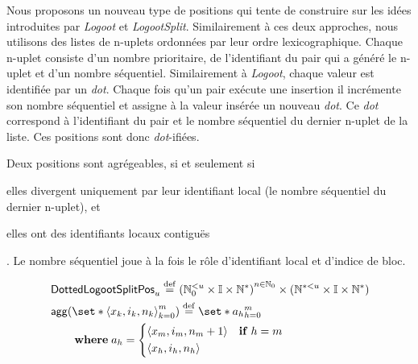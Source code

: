 Nous proposons un nouveau type de positions qui tente de construire sur les idées introduites par \emph{Logoot} et \emph{LogootSplit}.
Similairement à ces deux approches, nous utilisons des listes de n-uplets ordonnées par leur ordre lexicographique.
Chaque n-uplet consiste d'un nombre prioritaire, de l'identifiant du pair qui a généré le n-uplet et d'un nombre séquentiel. 
Similairement à \emph{Logoot}, chaque valeur est identifiée par un \emph{dot}.
Chaque fois qu'un pair exécute une insertion il incrémente son nombre séquentiel et assigne à la valeur insérée un nouveau \emph{dot}.
Ce \emph{dot} correspond à l'identifiant du pair et le nombre séquentiel du dernier n-uplet de la liste.
Ces positions sont donc \emph{dot}-ifiées.

Deux positions sont agrégeables, si et seulement si \begin{inlinelist}\item elles divergent uniquement par leur identifiant local (le nombre séquentiel du dernier n-uplet), et \item elles ont des identifiants locaux contiguës\end{inlinelist}.
Le nombre séquentiel joue à la fois le rôle d'identifiant local et d'indice de bloc.

\begin{align}
&\trm{DottedLogootSplitPos}_u \defeq {(\mathbb{N}_0^{< u} \times \mathbb{I} \times \mathbb{N}^*)}^{n \in \mathbb{N}_0} \times (\mathbb{N}^{* < u} \times \mathbb{I} \times \mathbb{N}^*)\\
&\begin{aligned}
    \MoveEqLeft \trm{agg}(\set*{\tuple*{x_k, i_k, n_k}}_{k=0}^m) \defeq \set*{a_h}_{h=0}^m\\
    &\where a_h = \begin{dcases}
        \tuple*{x_m, i_m, n_m + 1} & \when h = m\\
        \tuple*{x_h, i_h, n_h}
    \end{dcases}
\end{aligned}
\end{align}

